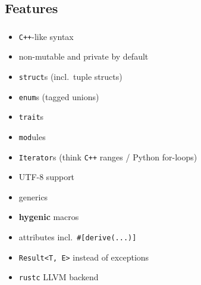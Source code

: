 \documentclass[aspectratio=43, t]{beamer}
\begin{document}
\subsection*{Features}
\begin{frame}[fragile]
	\frametitle{\subsecname}

	\begin{itemize}
		\item \texttt{C++}-like syntax
		\item non-mutable and private by default
		\item \texttt{struct}s (incl.\ tuple structs)
		\item \texttt{enum}s (tagged unions)
		\item \texttt{trait}s
		\item \texttt{mod}ules
		\item \texttt{Iterator}s (think \texttt{C++} ranges / Python for-loops)
		\item UTF-8 support
		\item generics
		\item \textbf{hygenic} macros
		\item attributes incl.\ \texttt{#[derive(...)]}
		\item \texttt{Result<T, E>} instead of exceptions
		\item \texttt{rustc} LLVM backend
	\end{itemize}
\end{frame}
\end{document}
